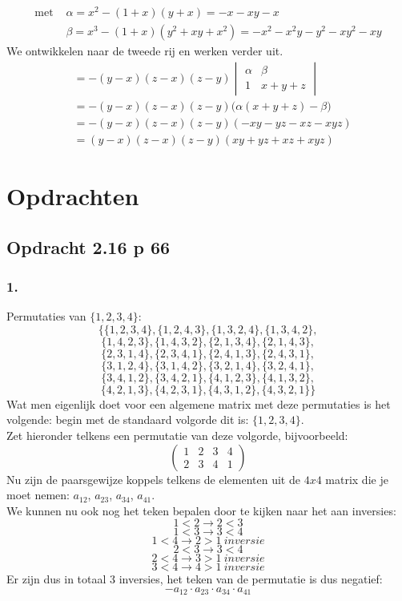 \documentclass[lineaire_algebra_oplossingen.tex]{subfiles}
\begin{document}
\begin{align*}
\text{met }
&\alpha = x^2-(1+x)(y+x) = -x-xy-x \\
&\beta = x^3-(1+x)(y^2+xy+x^2) = -x^2 - x^2y - y^2 - xy^2 - xy
\end{align*}
We ontwikkelen naar de tweede rij en werken verder uit.
\begin{align*}
&=
-(y-x)(z-x)(z-y)
\begin{vmatrix}
\alpha & \beta \\
1 & x+y+z
\end{vmatrix} \\
&=
-(y-x)(z-x)(z-y)
\Big(\alpha(x+y+z) - \beta\Big) \\
&=
-(y-x)(z-x)(z-y)
(-xy-yz-xz-xyz) \\
&=
(y-x)(z-x)(z-y)(xy+yz+xz+xyz)
\end{align*}
\section{Opdrachten}

\subsection{Opdracht 2.16 p 66}
\label{2.16}
\subsubsection*{1.}
Permutaties van $\{1,2,3,4\}$:
$$
\{\{1, 2, 3, 4\}, \{1, 2, 4, 3\}, \{1, 3, 2, 4\}, \{1, 3, 4, 2\},$$
$$ \{1, 4, 2, 3\}, \{1, 4, 3, 2\}, \{2, 1, 3, 4\}, \{2, 1, 4, 3\}, $$ 
$$\{2, 3, 1, 4\}, \{2, 3, 4, 1\}, \{2, 4, 1, 3\}, \{2, 4, 3, 1\}, $$
$$\{3, 1, 2, 4\}, \{3, 1, 4, 2\}, \{3, 2, 1, 4\}, \{3, 2, 4, 1\}, $$ $$
\{3, 4, 1, 2\}, \{3, 4, 2, 1\}, \{4, 1, 2, 3\}, \{4, 1, 3, 2\}, $$
$$\{4, 2, 1, 3\}, \{4, 2, 3, 1\}, \{4, 3, 1, 2\}, \{4, 3, 2, 1\}\}
$$
Wat men eigenlijk doet voor een algemene matrix met deze permutaties is het volgende: begin met de standaard volgorde dit is: $\{1,2,3,4\}$.\\ Zet hieronder telkens een permutatie van deze volgorde, bijvoorbeeld:
$$\begin{pmatrix}
1 & 2 & 3 & 4\\
2 & 3 & 4 & 1
\end{pmatrix}
$$
Nu zijn de paarsgewijze koppels telkens de elementen uit de $4x4$ matrix die je moet nemen: $a_{12}$, $a_{23}$, $a_{34}$, $a_{41}$.\\
We kunnen nu ook nog het teken bepalen door te kijken naar het aan inversies:\\
$$1 < 2 \rightarrow 2 < 3$$
$$1 < 3 \rightarrow 3 < 4$$
$$1 < 4 \rightarrow 2 > 1 \ inversie$$
$$2 < 3 \rightarrow 3 < 4$$
$$2 < 4 \rightarrow 3 > 1 \ inversie$$
$$3 < 4 \rightarrow 4 > 1 \ inversie$$
Er zijn dus in totaal 3 inversies, het teken van de permutatie is dus negatief:
$$-a_{12}\cdot a_{23}\cdot a_{34}\cdot a_{41}$$
\end{document}

